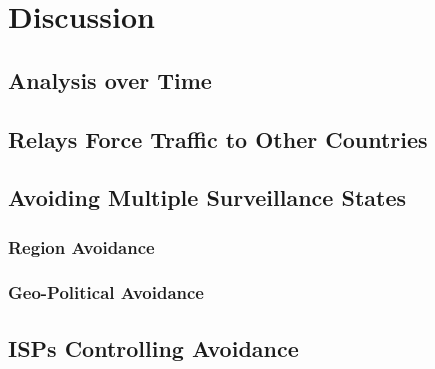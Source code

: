 \section{Discussion}
\label{discussion}

\subsection{Analysis over Time}

\subsection{Relays Force Traffic to Other Countries}

\subsection{Avoiding Multiple Surveillance States}
\subsubsection{Region Avoidance}
\subsubsection{Geo-Political Avoidance}

\subsection{ISPs Controlling Avoidance}
